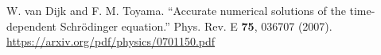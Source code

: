 \documentclass[11pt, a4paper]{article}
\newcommand{\schro}{Schr\"{o}dinger\xspace}
\begin{document}
\begin{thebibliography}{}
\setlength{\itemsep}{.2\itemsep} \setlength{\parsep}{.5\parsep}

 W. van Dijk and F. M. Toyama. ``Accurate numerical solutions of the time-dependent \schro equation.'' Phys. Rev. E \textbf{75}, 036707 (2007). \url{https://arxiv.org/pdf/physics/0701150.pdf}
\end{thebibliography}
\end{document}
